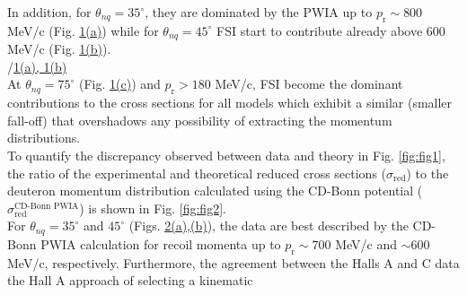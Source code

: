 In addition, for $\theta_{nq}=35^{\circ}$, they are dominated by the PWIA up to $p_{\mathrm{r}}\sim800$ MeV/c
(Fig. \hyperref[fig:fig1]{1(a)})  while for $\theta_{nq}=45^{\circ}$  FSI start to contribute already above 600 MeV/c (Fig. \hyperref[fig:fig1]{1(b)}).\DIFdelbegin {}\DIFdelend \DIFaddbegin \\
\indent {}\DIFaddend /\DIFdelbegin {}\DIFdelend \DIFaddbegin {}\hyperref[fig:fig1]{1(a), 1(b)}\DIFaddend \\ 
\indent At $\theta_{nq}=75^{\circ}$ (Fig. \hyperref[fig:fig1]{1(c)}) and $p_{\mathrm{r}}>180$ MeV/c, FSI become the dominant contributions to the cross sections for all models which exhibit a similar
\DIFdelbegin {}\DIFdelend \DIFaddbegin {}\DIFaddend (smaller fall-off) that overshadows any possibility of extracting the \DIFaddbegin {}\DIFaddend momentum distributions.\\
\indent To quantify the discrepancy observed between data and theory in Fig. \ref{fig:fig1}, the ratio of the experimental and theoretical reduced cross sections ($\sigma_{\mathrm{red}}$) to the
deuteron momentum distribution calculated using the CD-Bonn potential ($\sigma^{\text{CD-Bonn PWIA}}_{\mathrm{red}}$) \cite{PhysRevC.63.024001} is shown in Fig. \ref{fig:fig2}. \\
\indent For $\theta_{nq}=35^{\circ}$ and $45^{\circ}$ (Figs. \hyperref[fig:fig2]{2(a),(b)}), the data are best described by the \DIFaddbegin {}\DIFaddend CD-Bonn PWIA calculation for recoil momenta up
to $p_{\mathrm{r}}\sim700$ MeV/c and $\sim600$ MeV/c, respectively. Furthermore, the agreement between the Halls A and C data \DIFdelbegin {}\DIFdelend \DIFaddbegin {}\DIFaddend the Hall A approach of selecting a kinematic
